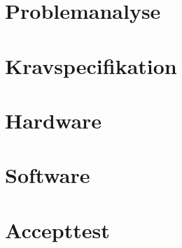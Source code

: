 



\renewcommand\chaptername{Chapter}
\renewcommand\contentsname{Table of Contents}
\renewcommand\figurename{Figure}
\renewcommand\tablename{Table} 


\cleardoublepage

\frontmatter




\cleardoublepage

\tableofcontents*
\newpage
\printnomenclature
\renewcommand*\listfigurename{List of Figures}
\renewcommand*\listtablename{List of Tables}

\mainmatter
\chapter{Problemanalyse}


\chapter{Kravspecifikation}

\chapter{Hardware}








\chapter{Software}




\chapter{Accepttest}

